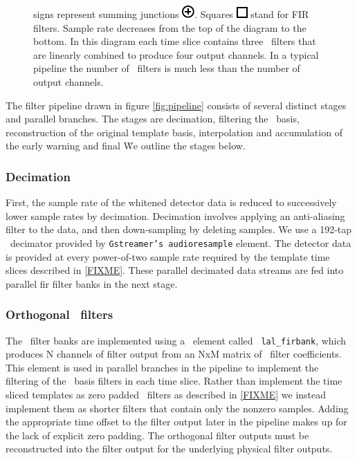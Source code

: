 \begin{figure}[htbp]
{signs represent summing junctions
\protect\includegraphics{figures/adder-symbol.pdf}.  Squares
\protect\includegraphics{figures/fir-symbol.pdf} stand for FIR filters.  Sample
rate decreases from the top of the diagram to the bottom.  In this diagram each
time slice contains three \fir\ filters that are linearly combined to produce
four output channels.  In a typical pipeline the number of \fir\ filters is
much less than the number of output channels.}
\end{figure}

The filter pipeline drawn in figure \ref{fig:pipeline} consists of several
distinct stages and parallel branches.  The stages are decimation, filtering
the \SVD\ basis, reconstruction of the original template basis, interpolation
and accumulation of the early warning and final \SNR\.  We outline the stages
below. 

\subsubsection{Decimation}

First, the sample rate of the whitened detector data is reduced to successively
lower sample rates by decimation.  Decimation involves applying an anti-aliasing
filter to the data, and then down-sampling by deleting samples.  We use a
192-tap \fir\ decimator provided by {\tt Gstreamer's audioresample}
element.  The detector data is provided at every power-of-two sample rate
required by the template time slices described in \eqref{FIXME}.  These
parallel decimated data streams are fed into parallel fir filter banks in the
next stage.

\subsubsection{Orthogonal \fir\ filters}

The \fir\ filter banks are implemented using a \gstlal\ element called {\tt
lal\_firbank}, which produces N channels of filter output from an NxM matrix of
\fir\ filter coefficients.  This element is used in parallel branches in the
pipeline to implement the filtering of the \SVD\ basis filters in each time
slice.  Rather than implement the time sliced templates as zero padded \fir\
filters as described in \eqref{FIXME} we instead implement them as shorter
filters that contain only the nonzero samples.  Adding the appropriate time
offset to the filter output later in the pipeline makes up for the lack of
explicit zero padding.  The orthogonal filter outputs must be reconstructed
into the filter output for the underlying physical filter outputs. 

